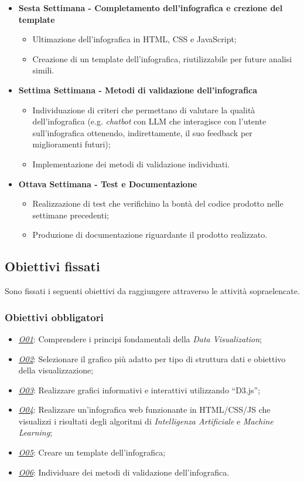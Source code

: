 \begin{itemize}
    \item \textbf{Sesta Settimana - Completamento dell'infografica e crezione del template} 
    \begin{itemize}
        \item Ultimazione dell'infografica in HTML, CSS e JavaScript;
        \item Creazione di un template dell'infografica, riutilizzabile per future analisi simili.
    \end{itemize}
    \item \textbf{Settima Settimana - Metodi di validazione dell'infografica} 
    \begin{itemize}
        \item Individuazione di criteri che permettano di valutare la qualità dell'infografica (e.g. \textit{chatbot} con LLM che interagisce con l'utente sull'infografica ottenendo, indirettamente, il suo feedback per miglioramenti futuri);
        \item Implementazione dei metodi di validazione individuati.
    \end{itemize}
    \item \textbf{Ottava Settimana - Test e Documentazione} 
    \begin{itemize}
        \item Realizzazione di test che verifichino la bontà del codice prodotto nelle settimane precedenti;
        \item Produzione di documentazione riguardante il prodotto realizzato.
    \end{itemize}
\end{itemize}

\subsection{Obiettivi fissati}
Sono fissati i seguenti obiettivi da raggiungere attraverso le attività sopraelencate.

\subsubsection{Obiettivi obbligatori}
\begin{itemize}
    \item \underline{\textit{O01}}: Comprendere i principi fondamentali della \textit{Data Visualization};
    \item \underline{\textit{O02}}: Selezionare il grafico più adatto per tipo di struttura dati e obiettivo della visualizzazione;
    \item \underline{\textit{O03}}: Realizzare grafici informativi e interattivi utilizzando ``D3.js'';
    \item \underline{\textit{O04}}: Realizzare un'infografica web funzionante in HTML/CSS/JS che visualizzi i risultati degli algoritmi di \textit{Intelligenza Artificiale} e \textit{Machine Learning};
    \item \underline{\textit{O05}}: Creare un template dell'infografica;
    \item \underline{\textit{O06}}: Individuare dei metodi di validazione dell'infografica.
\end{itemize}


